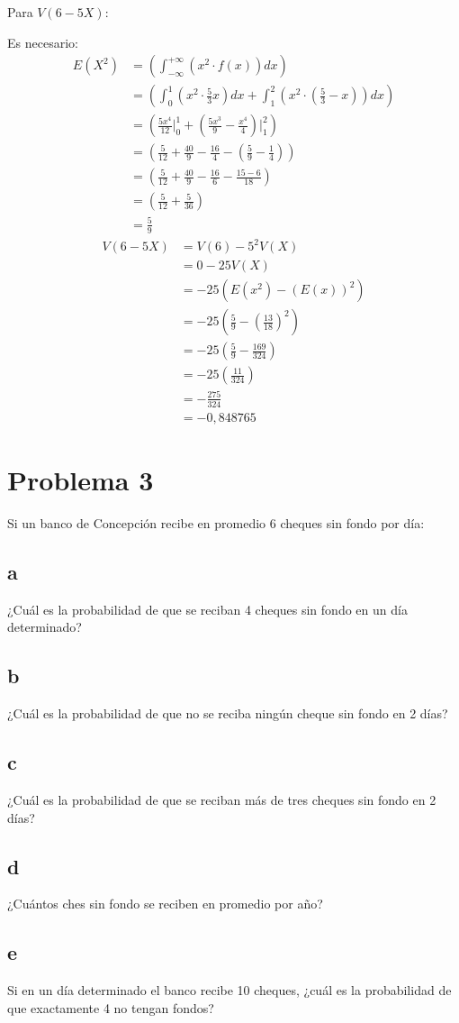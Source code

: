 \documentclass{templateNote}
\begin{document}
Para $V(6-5X)$:

Es necesario:
\begin{align*}
    E(X^2) &= \left(\int_{-\infty}^{+\infty}{(x^2\cdot f(x))dx}\right) \\
    &= \left(\int_{0}^{1}{(x^2\cdot \frac{5}{3}x)dx} + \int_{1}^{2}{(x^2\cdot (\frac{5}{3} - x))dx}\right) \\
    &= \left(\frac{5x^4}{12}\Big|_{0}^{1} + \left(\frac{5x^3}{9} - \frac{x^4}{4}\right)\Big|_{1}^{2}\right) \\
    &= \left(\frac{5}{12} + \frac{40}{9} - \frac{16}{4} - \left(\frac{5}{9} - \frac{1}{4}\right)\right) \\
    &= \left(\frac{5}{12} + \frac{40}{9} - \frac{16}{6} - \frac{15-6}{18}\right) \\
    &= \left(\frac{5}{12} + \frac{5}{36}\right) \\
    &= \frac{5}{9}
\end{align*}
\begin{align*}
    V(6-5X) &= V(6) - 5^2V(X) \\
    &= 0 - 25 V(X) \\
    &= - 25 \left(E(x^2) - (E(x))^2\right) \\
    &= -25 \left(\frac{5}{9} - \left(\frac{13}{18}\right)^2\right) \\
    &= -25 \left(\frac{5}{9} - \frac{169}{324}\right) \\
    &= -25 \left(\frac{11}{324}\right) \\
    &= - \frac{275}{324} \\
    &= -0,848765
\end{align*}

\newpage
\section{Problema 3}
Si un banco de Concepción recibe en promedio 6 cheques sin fondo por día:
\subsection{a}
¿Cuál es la probabilidad de que se reciban 4 cheques sin fondo en un día determinado?

\subsection{b}
¿Cuál es la probabilidad de que no se reciba ningún cheque sin fondo en 2 días?

\subsection{c}
¿Cuál es la probabilidad de que se reciban más de tres cheques sin fondo en 2 días?

\subsection{d}
¿Cuántos ches sin fondo se reciben en promedio por año?

\subsection{e}
Si en un día determinado el banco recibe 10 cheques, ¿cuál es la probabilidad de que exactamente 4
no tengan fondos?
\end{document}
